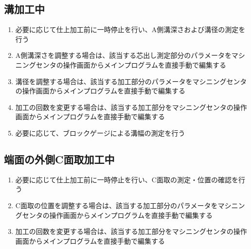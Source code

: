 \subsection{溝加工中}
\begin{enumerate}
\item 必要に応じて仕上加工前に一時停止を行い、A側溝深さおよび溝径の測定を行う
\item A側溝深さを調整する場合は、該当する芯出し測定部分のパラメータをマシニングセンタの操作画面からメインプログラムを直接手動で編集する
\item 溝径を調整する場合は、該当する加工部分のパラメータをマシニングセンタの操作画面からメインプログラムを直接手動で編集する
\item {}加工の回数を変更する場合は、該当する加工部分をマシニングセンタの操作画面からメインプログラムを直接手動で編集する
\item 必要に応じて、ブロックゲージによる溝幅の測定を行う
\end{enumerate}


\subsection{端面の外側C面取加工中}
\begin{enumerate}
\item 必要に応じて仕上加工前に一時停止を行い、C面取の測定・位置の確認を行う
\item C面取の位置を調整する場合は、該当する加工部分のパラメータをマシニングセンタの操作画面からメインプログラムを直接手動で編集する
\item {}加工の回数を変更する場合は、該当する加工部分をマシニングセンタの操作画面からメインプログラムを直接手動で編集する
\end{enumerate}


